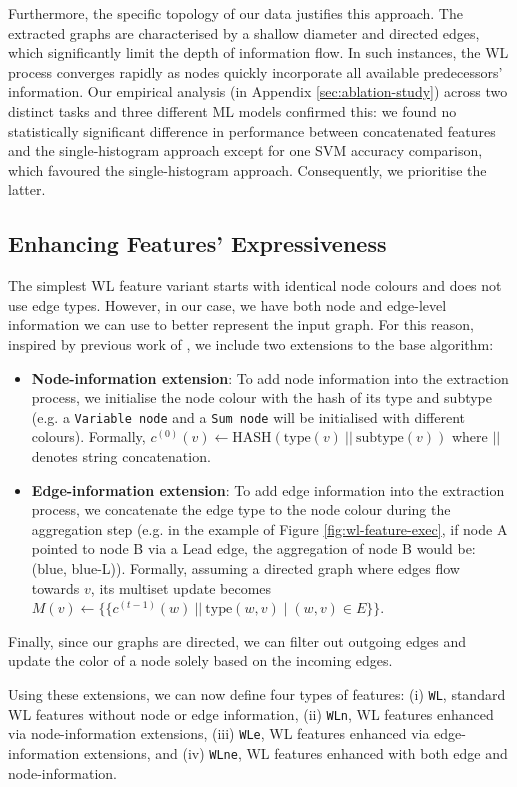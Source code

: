 Furthermore, the specific topology of our data justifies this approach. The extracted graphs are characterised by a shallow diameter and directed edges, which significantly limit the depth of information flow. In such instances, the WL process converges rapidly as nodes quickly incorporate all available predecessors' information. Our empirical analysis (in Appendix \ref{sec:ablation-study}) across two distinct tasks and three different ML models confirmed this: we found no statistically significant difference in performance between concatenated features and the single-histogram approach except for one SVM accuracy comparison, which favoured the single-histogram approach. Consequently, we prioritise the latter.

\subsection{Enhancing Features' Expressiveness}
The simplest WL feature variant starts with identical node colours and does not use edge types. However, in our case, we have both node and edge-level information we can use to better represent the input graph. For this reason, inspired by previous work of \citet{Togninalli2019-qa},  we include two extensions to the base algorithm:
\begin{itemize}
    \item \textbf{Node-information extension}: To add node information into the extraction process, we initialise the node colour with the hash of its type and subtype (e.g. a \texttt{Variable node} and a \texttt{Sum node} will be initialised with different colours). Formally, $c^{(0)}(v) \leftarrow \text{HASH}(\text{type}(v) \ || \ \text{subtype}(v))$ where $||$ denotes string concatenation.
    \item \textbf{Edge-information extension}: To add edge information into the extraction process, we concatenate the edge type to the node colour during the aggregation step (e.g. in the example of Figure \ref{fig:wl-feature-exec}, if node A pointed to node B via a Lead edge, the aggregation of node B would be: (blue, blue-L)). Formally, assuming a directed graph where edges flow towards $v$, its multiset update becomes $M(v) \leftarrow \{\!\!\{c^{(t-1)}(w) \ || \ \text{type}(w, v) \mid (w,v) \in E\}\!\!\}$.
\end{itemize}
Finally, since our graphs are directed, we can filter out outgoing edges and update the color of a node solely based on the incoming edges.

Using these extensions, we can now define four types of features: (i) \texttt{WL}, standard WL features without node or edge information, (ii) \texttt{WLn}, WL features enhanced via node-information extensions, (iii) \texttt{WLe},  WL features enhanced via edge-information extensions, and (iv) \texttt{WLne}, WL features enhanced with both edge and node-information. 

